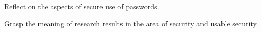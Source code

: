 \item Reflect on the aspects of secure use of passwords.
\item Grasp the meaning of research results in the area of security and usable 
security.
